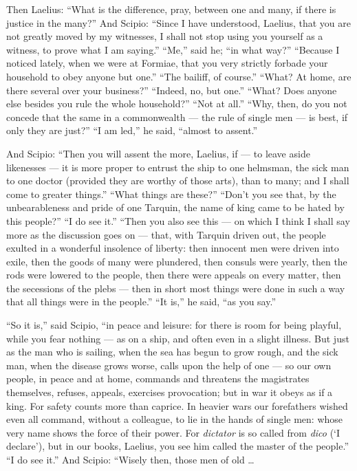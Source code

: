  Then Laelius: ``What is the difference, pray, between one and many, if there is justice in the many?'' And Scipio: ``Since I have understood, Laelius, that you are not greatly moved by my witnesses, I shall not stop using you yourself as a witness, to prove what I am saying.'' ``Me,'' said he; ``in what way?'' ``Because I noticed lately, when we were at Formiae, that you very strictly forbade your household to obey anyone but one.'' ``The bailiff, of course.'' ``What? At home, are there several over your business?'' ``Indeed, no, but one.'' ``What? Does anyone else besides you rule the whole household?'' ``Not at all.'' ``Why, then, do you not concede that the same in a commonwealth --- the rule of single men --- is best, if only they are just?'' ``I am led,'' he said, ``almost to assent.''

 And Scipio: ``Then you will assent the more, Laelius, if --- to leave aside likenesses --- it is more proper to entrust the ship to one helmsman, the sick man to one doctor (provided they are worthy of those arts), than to many; and I shall come to greater things.'' ``What things are these?'' ``Don't you see that, by the unbearableness and pride of one Tarquin, the name of king came to be hated by this people?'' ``I do see it.'' ``Then you also see this --- on which I think I shall say more as the discussion goes on --- that, with Tarquin driven out, the people exulted in a wonderful insolence of liberty: then innocent men were driven into exile, then the goods of many were plundered, then consuls were yearly, then the rods were lowered to the people, then there were appeals on every matter, then the secessions of the plebs --- then in short most things were done in such a way that all things were in the people.'' ``It is,'' he said, ``as you say.''

 ``So it is,'' said Scipio, ``in peace and leisure: for there is room for being playful, while you fear nothing --- as on a ship, and often even in a slight illness. But just as the man who is sailing, when the sea has begun to grow rough, and the sick man, when the disease grows worse, calls upon the help of one --- so our own people, in peace and at home, commands and threatens the magistrates themselves, refuses, appeals, exercises provocation; but in war it obeys as if a king. For safety counts more than caprice. In heavier wars our forefathers wished even all command, without a colleague, to lie in the hands of single men: whose very name shows the force of their power. For \textit{dictator} is so called from \textit{dico} (`I declare'), but in our books, Laelius, you see him called the master of the people.'' ``I do see it.'' And Scipio: ``Wisely then, those men of old \ldots


